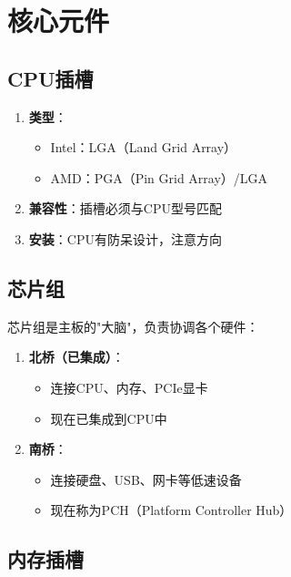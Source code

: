\documentclass[12pt,UTF8]{ctexbook}
\begin{document}
\chapter{核心元件}

\section{CPU插槽}

\begin{enumerate}
    \item \textbf{类型}：
    \begin{itemize}[leftmargin=2em]
        \item Intel：LGA（Land Grid Array）
        \item AMD：PGA（Pin Grid Array）/LGA
    \end{itemize}
    
    \item \textbf{兼容性}：插槽必须与CPU型号匹配
    \item \textbf{安装}：CPU有防呆设计，注意方向
\end{enumerate}

\section{芯片组}

芯片组是主板的"大脑"，负责协调各个硬件：

\begin{enumerate}
    \item \textbf{北桥（已集成）}：
    \begin{itemize}[leftmargin=2em]
        \item 连接CPU、内存、PCIe显卡
        \item 现在已集成到CPU中
    \end{itemize}
    
    \item \textbf{南桥}：
    \begin{itemize}[leftmargin=2em]
        \item 连接硬盘、USB、网卡等低速设备
        \item 现在称为PCH（Platform Controller Hub）
    \end{itemize}
\end{enumerate}

\section{内存插槽}
\end{document}
